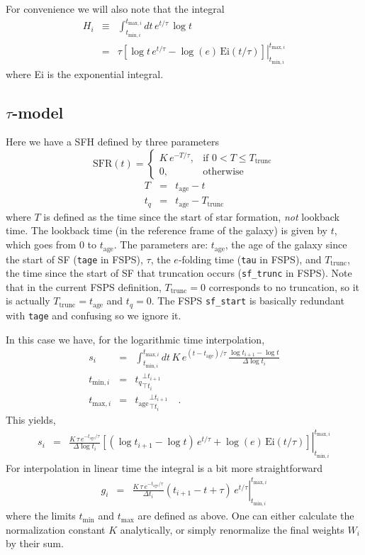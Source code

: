 \documentclass[12pt, letterpaper, preprint]{aastex}
\newcommand{\tmin}[1][]{t_{\mathrm{min} #1}}
\newcommand{\tmax}[1][]{t_{\mathrm{max} #1}}
\newcommand{\dlt}{\Delta\log t_i}
\newcommand{\dt}{\Delta t_i}
\newcommand{\tintegral}{\int_{\tmin[,i]}^{\tmax[,i]} dt}
\newcommand{\tinterval}{\right|_{\tmin[,i]}^{\tmax[,i]}}
\newcommand{\clip}[3][]{{#1}_{\top {#2}}^{\bot {#3}}}
\newcommand{\sftrunc}{T_{\mathrm{trunc}}}
\newcommand{\tage}{t_{\mathrm{age}}}
\begin{document}
For convenience we will also note that the integral
\begin{eqnarray}
H_i & \equiv & \tintegral \, e^{t/\tau} \, \log t \nonumber \\
  & = & \left. \tau \left[ \log t \, e^{t/\tau} - \log(e) \, \mathrm{Ei}(t/\tau) \right]\tinterval
\end{eqnarray}
where Ei is the exponential integral.

\subsection{$\tau$-model}
Here we have a SFH defined by three parameters
\[ 
\mathrm{SFR}(t) = 
\begin{cases}
K \, e^{-T/\tau}, &  \text{if } 0 < T \leq \sftrunc \\
0, & \text{otherwise}
\end{cases}
\]
\begin{eqnarray}
T & = & \tage - t \nonumber \\
t_q & = & \tage - \sftrunc \nonumber 
\end{eqnarray}
where $T$ is defined as the time since the start of star formation, \emph{not} lookback time.  
The lookback time  (in the reference frame of the galaxy) is given by $t$, which goes from 0 to $\tage$.
The parameters are: 
$\tage$, the age of the galaxy since the start of SF (\texttt{tage} in FSPS), 
$\tau$, the $e$-folding time (\texttt{tau} in FSPS), and
$\sftrunc$, the time since the start of SF that truncation occurs (\texttt{sf\_trunc} in FSPS).
Note that in the current FSPS definition, $\sftrunc = 0$ corresponds to no truncation, so it is actually $\sftrunc= \tage$ and $t_q=0$.
The FSPS \texttt{sf\_start} is basically redundant with \texttt{tage} and confusing so we ignore it.

In this case we have, for the logarithmic time interpolation,
\begin{eqnarray}
s_i  & = & \tintegral \, K \, e^{(t-\tage) /\tau}\, \frac{\log t_{i+1} - \log t}{\dlt} \nonumber \\
\tmin[,i] & = & \clip[t_q]{t_i}{t_{i+1}} \nonumber \\
\tmax[,i] & = & \clip[\tage]{t_i}{t_{i+1}} \quad . \nonumber
\end{eqnarray}
This yields, 
\begin{eqnarray}
s_i & = & \left. \frac{K \, \tau \, e^{-\tage/\tau}}{\dlt} \left [(\log t_{i+1} - \log t)\, e^{t/\tau} + 
          \log(e) \, \mathrm{Ei}(t/\tau)\right]  \tinterval
\end{eqnarray}
For interpolation in linear time the integral is a bit more straightforward
\begin{eqnarray}
g_i & = & \left. \frac{K \, \tau \, e^{-\tage/\tau}}{\dt} (t_{i+1} - t + \tau)\, e^{t/\tau} \tinterval
\end{eqnarray}
where the limits $\tmin$ and $\tmax$ are defined as above.
One can either calculate the normalization constant $K$ analytically, or simply renormalize the final weights $W_i$ by their sum.
\end{document}

